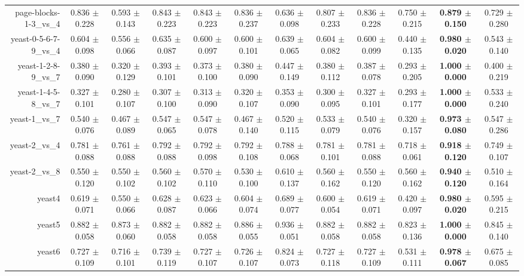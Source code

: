 \begin{table}[!ht]
{\begin{tabular}{r c c c c c c c c c c c}
page-blocks-1-3\_vs\_4 & 0.836 $\pm$ 0.228 & 0.593 $\pm$ 0.143 & 0.843 $\pm$ 0.223 & 0.843 $\pm$ 0.223 & 0.836 $\pm$ 0.237 & 0.636 $\pm$ 0.098 & 0.807 $\pm$ 0.233 & 0.836 $\pm$ 0.228 & 0.750 $\pm$ 0.215 & \textbf{0.879 $\pm$ 0.150} & 0.729 $\pm$ 0.280 \\
yeast-0-5-6-7-9\_vs\_4 & 0.604 $\pm$ 0.098 & 0.556 $\pm$ 0.066 & 0.635 $\pm$ 0.087 & 0.600 $\pm$ 0.097 & 0.600 $\pm$ 0.101 & 0.639 $\pm$ 0.065 & 0.604 $\pm$ 0.082 & 0.600 $\pm$ 0.099 & 0.440 $\pm$ 0.135 & \textbf{0.980 $\pm$ 0.020} & 0.543 $\pm$ 0.140 \\
yeast-1-2-8-9\_vs\_7 & 0.380 $\pm$ 0.090 & 0.320 $\pm$ 0.129 & 0.393 $\pm$ 0.101 & 0.373 $\pm$ 0.100 & 0.380 $\pm$ 0.090 & 0.447 $\pm$ 0.149 & 0.380 $\pm$ 0.112 & 0.387 $\pm$ 0.078 & 0.293 $\pm$ 0.205 & \textbf{1.000 $\pm$ 0.000} & 0.400 $\pm$ 0.219 \\
yeast-1-4-5-8\_vs\_7 & 0.327 $\pm$ 0.101 & 0.280 $\pm$ 0.107 & 0.307 $\pm$ 0.100 & 0.313 $\pm$ 0.090 & 0.320 $\pm$ 0.107 & 0.353 $\pm$ 0.090 & 0.300 $\pm$ 0.095 & 0.327 $\pm$ 0.101 & 0.293 $\pm$ 0.177 & \textbf{1.000 $\pm$ 0.000} & 0.533 $\pm$ 0.240 \\
yeast-1\_vs\_7 & 0.540 $\pm$ 0.076 & 0.467 $\pm$ 0.089 & 0.547 $\pm$ 0.065 & 0.547 $\pm$ 0.078 & 0.467 $\pm$ 0.140 & 0.520 $\pm$ 0.115 & 0.533 $\pm$ 0.079 & 0.540 $\pm$ 0.076 & 0.320 $\pm$ 0.157 & \textbf{0.973 $\pm$ 0.080} & 0.547 $\pm$ 0.286 \\
yeast-2\_vs\_4 & 0.781 $\pm$ 0.088 & 0.761 $\pm$ 0.088 & 0.792 $\pm$ 0.088 & 0.792 $\pm$ 0.098 & 0.792 $\pm$ 0.108 & 0.788 $\pm$ 0.068 & 0.781 $\pm$ 0.101 & 0.781 $\pm$ 0.088 & 0.718 $\pm$ 0.061 & \textbf{0.918 $\pm$ 0.120} & 0.749 $\pm$ 0.107 \\
yeast-2\_vs\_8 & 0.550 $\pm$ 0.120 & 0.550 $\pm$ 0.102 & 0.560 $\pm$ 0.102 & 0.570 $\pm$ 0.110 & 0.530 $\pm$ 0.100 & 0.610 $\pm$ 0.137 & 0.560 $\pm$ 0.162 & 0.550 $\pm$ 0.120 & 0.560 $\pm$ 0.162 & \textbf{0.940 $\pm$ 0.120} & 0.510 $\pm$ 0.164 \\
yeast4 & 0.619 $\pm$ 0.071 & 0.550 $\pm$ 0.066 & 0.628 $\pm$ 0.087 & 0.623 $\pm$ 0.066 & 0.604 $\pm$ 0.074 & 0.689 $\pm$ 0.077 & 0.600 $\pm$ 0.054 & 0.619 $\pm$ 0.071 & 0.420 $\pm$ 0.097 & \textbf{0.980 $\pm$ 0.020} & 0.595 $\pm$ 0.215 \\
yeast5 & 0.882 $\pm$ 0.058 & 0.873 $\pm$ 0.060 & 0.882 $\pm$ 0.058 & 0.882 $\pm$ 0.058 & 0.886 $\pm$ 0.055 & 0.936 $\pm$ 0.051 & 0.882 $\pm$ 0.058 & 0.882 $\pm$ 0.058 & 0.823 $\pm$ 0.136 & \textbf{1.000 $\pm$ 0.000} & 0.845 $\pm$ 0.140 \\
yeast6 & 0.727 $\pm$ 0.109 & 0.716 $\pm$ 0.101 & 0.739 $\pm$ 0.119 & 0.727 $\pm$ 0.107 & 0.726 $\pm$ 0.107 & 0.824 $\pm$ 0.073 & 0.727 $\pm$ 0.118 & 0.727 $\pm$ 0.109 & 0.531 $\pm$ 0.111 & \textbf{0.978 $\pm$ 0.067} & 0.675 $\pm$ 0.085 \\

\end{tabular}}
\end{table}
